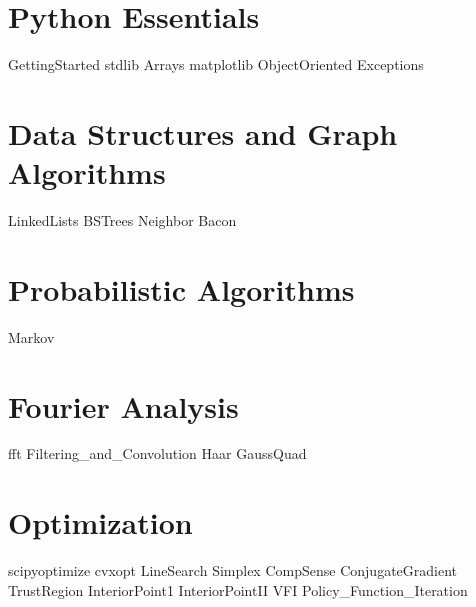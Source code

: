 \documentclass[nociteref]{SIAM-GH-book}
\begin{document}
\part{Python Essentials}
{GettingStarted}
{stdlib}
{Arrays}
{matplotlib}
{ObjectOriented}
{Exceptions}

\part{Data Structures and Graph Algorithms}
{LinkedLists}
{BSTrees}
{Neighbor}
{Bacon}
\part{Probabilistic Algorithms}
{Markov}
\part{Fourier Analysis}
{fft}
{Filtering_and_Convolution}
{Haar}
{GaussQuad}


\part{Optimization}
{scipyoptimize}
{cvxopt}
{LineSearch}
{Simplex}
{CompSense}
{ConjugateGradient}
{TrustRegion}
{InteriorPoint1}
{InteriorPointII}
{VFI}
{Policy_Function_Iteration}
\end{document}
